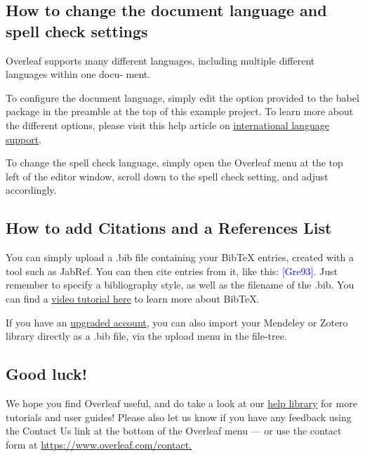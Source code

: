 \documentclass[10pt,english]{article}
\begin{document}
	\subsection{How to change the document language and spell check settings}
	Overleaf supports many different languages, including multiple different languages within one docu-
	ment.
	
	 To configure the document language, simply edit the option provided to the babel package in the
	preamble at the top of this example project. To learn more about the different options, please visit
	this help article on \href{https://www.overleaf.com/learn/latex/International_language_support}{international language support}.
	
 	 To change the spell check language, simply open the Overleaf menu at the top left of the editor
	window, scroll down to the spell check setting, and adjust accordingly.
	\subsection{How to add Citations and a References List}
	  You can simply upload a .bib file containing your BibTeX entries, created with a tool such as JabRef.
	  You can then cite entries from it, like this: \textcolor{blue}{[Gre93]}. Just remember to specify a bibliography style, as
	  well as the filename of the .bib. You can find a \href{https://www.overleaf.com/help/97-how-to-include-a-bibliography-using-bibtex}{video tutorial here} to learn more about BibTeX.
	  
	   If you have an \href{https://www.overleaf.com/user/subscription/plans}{upgraded  account}, you can also import your Mendeley or Zotero library directly as
	  a .bib file, via the upload menu in the file-tree.
	  \subsection{Good luck!}
        We hope you find Overleaf useful, and do take a look at our \href{https://www.overleaf.com/learn}{help library} for more tutorials and user
       guides! Please also let us know if you have any feedback using the Contact Us link at the bottom of
       the Overleaf menu — or use the contact form at
       \href{http://www.overleaf.com/contact}{https://www.overleaf.com/contact.}
       
       \cite{greenwade1993comprehensive}
       
       
	 
\end{document}
